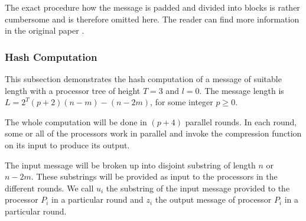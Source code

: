 \documentclass[letterpaper]{article}
\begin{document}
The exact procedure how the message is padded and divided into blocks is rather cumbersome and is therefore omitted here. The reader can find more information in the original paper \cite{parsha256}.


\subsubsection{Hash Computation}\label{parsha-hash}
This subsection demonstrates the hash computation of a message of suitable length with a processor tree of height $T = 3$ and $l = 0$. The message length is $L = 2^T(p+2)(n-m)-(n-2m)$, for some integer $p \geq 0$.


The whole computation will be done in $(p+4)$ parallel rounds. In each round, some or all of the processors work in parallel and invoke the compression function on its input to produce its output.

The input message will be broken up into disjoint substring of length $n$ or $n-2m$. These substrings will be provided as input to the processors in the different rounds. We call $u_i$ the substring of the input message provided to the processor $P_i$ in a particular round and $z_i$ the output message of processor $P_i$ in a particular round.
\end{document}
